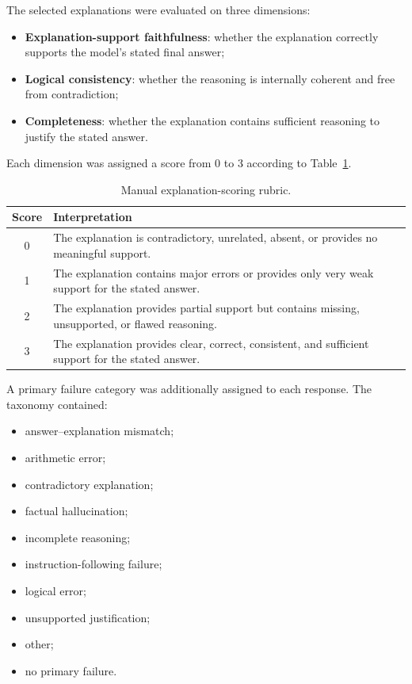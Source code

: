 \documentclass{article}
\begin{document}
The selected explanations were evaluated on three dimensions:

\begin{itemize}
    \item \textbf{Explanation-support faithfulness}: whether the
    explanation correctly supports the model's stated final answer;

    \item \textbf{Logical consistency}: whether the reasoning is
    internally coherent and free from contradiction;

    \item \textbf{Completeness}: whether the explanation contains
    sufficient reasoning to justify the stated answer.
\end{itemize}

Each dimension was assigned a score from 0 to 3 according to
Table~\ref{tab:rubric}.

\begin{table}[t]
\centering
\caption{Manual explanation-scoring rubric.}
\label{tab:rubric}
\begin{tabular}{cp{8.2cm}}
\toprule
\textbf{Score} & \textbf{Interpretation} \\
\midrule
0 &
The explanation is contradictory, unrelated, absent, or provides no
meaningful support. \\

1 &
The explanation contains major errors or provides only very weak
support for the stated answer. \\

2 &
The explanation provides partial support but contains missing,
unsupported, or flawed reasoning. \\

3 &
The explanation provides clear, correct, consistent, and sufficient
support for the stated answer. \\
\bottomrule
\end{tabular}
\end{table}

A primary failure category was additionally assigned to each response.
The taxonomy contained:

\begin{itemize}
    \item answer--explanation mismatch;
    \item arithmetic error;
    \item contradictory explanation;
    \item factual hallucination;
    \item incomplete reasoning;
    \item instruction-following failure;
    \item logical error;
    \item unsupported justification;
    \item other;
    \item no primary failure.
\end{itemize}
\end{document}
